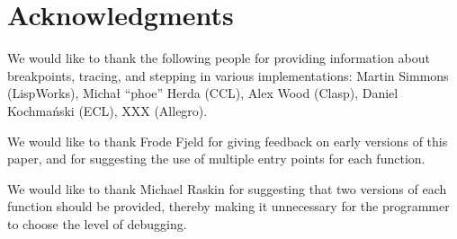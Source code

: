 \section{Acknowledgments} 

We would like to thank the following people for providing information
about breakpoints, tracing, and stepping in various \commonlisp{}
implementations: Martin Simmons (LispWorks), Michał ``phoe'' Herda
(CCL), Alex Wood (Clasp), Daniel Kochmański (ECL), XXX (Allegro).

We would like to thank Frode Fjeld for giving feedback on early
versions of this paper, and for suggesting the use of multiple entry
points for each function.

We would like to thank Michael Raskin for suggesting that two versions
of each function should be provided, thereby making it unnecessary for
the programmer to choose the level of debugging.
